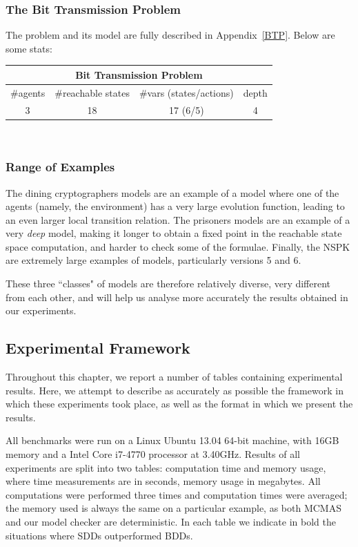 \documentclass[11pt]{report}
\begin{document}
\subsubsection{The Bit Transmission Problem}
The problem and its model are fully described in Appendix~\ref{BTP}. Below are some stats: \\

{\centering
\begin{tabular}{*{4}{c}}
\hline
\hline
\multicolumn{4}{c}{\textbf{Bit Transmission Problem}}\\ \hline
\#agents & \#reachable states & \#vars (states/actions) & depth \\\hline
3 & 18 & 17 (6/5) & 4 \\
\hline
\end{tabular}
\\}

\subsubsection{Range of Examples}

The dining cryptographers models are an example of a model where one of the agents (namely, the environment) has a very large evolution function, leading to an even larger local transition relation. The prisoners models are an example of a very \textit{deep} model, making it longer to obtain a fixed point in the reachable state space computation, and harder to check some of the formulae.
Finally, the NSPK are extremely large examples of models, particularly versions 5 and 6. 

These three ``classes" of models are therefore relatively diverse, very different from each other, and will help us analyse more accurately the results obtained in our experiments. 


\subsection{Experimental Framework} 

Throughout this chapter, we report a number of tables containing experimental results. Here, we attempt to describe as accurately as possible the framework in which these experiments took place, as well as the format in which we present the results. 

All benchmarks were run on a Linux Ubuntu 13.04 64-bit machine, with 16GB memory and a Intel Core i7-4770 processor at 3.40GHz. 
Results of all experiments are split into two tables: computation time and memory usage, where time measurements are in seconds, memory usage in megabytes. All computations were performed three times and computation times were averaged; the memory used is always the same on a particular example, as both MCMAS and our model checker are deterministic. In each table we indicate in bold the situations where SDDs outperformed BDDs.
\end{document}
